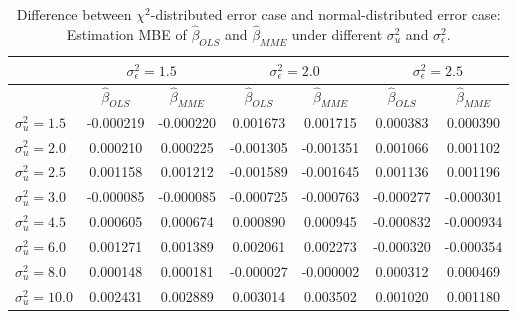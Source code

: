 \documentclass{article}
\begin{document}
\begin{table}[ht]
    \centering
    \caption{Difference between $\chi^2$-distributed error case and normal-distributed error case: Estimation MBE of $\hat{\beta}_{OLS}$ and $\hat{\beta}_{MME}$ under different $\sigma^2_u$ and $\sigma^2_\epsilon$.}
    \label{Tab:MBE_diff_chi_normal}
    \begin{tabular}[t]{lcccccc}
        \hline
        &\multicolumn{2}{c}{$\sigma^2_\epsilon=1.5$}&\multicolumn{2}{c}{$\sigma^2_\epsilon=2.0$}&\multicolumn{2}{c}{$\sigma^2_\epsilon=2.5$}\\
        \hline
        &$\hat{\beta}_{OLS}$&$\hat{\beta}_{MME}$&$\hat{\beta}_{OLS}$&$\hat{\beta}_{MME}$&$\hat{\beta}_{OLS}$&$\hat{\beta}_{MME}$\\
        \hline
        $\sigma^2_u = 1.5$&-0.000219&-0.000220&0.001673&0.001715&0.000383&0.000390\\
        $\sigma^2_u = 2.0$&0.000210&0.000225&-0.001305&-0.001351&0.001066&0.001102\\
        $\sigma^2_u = 2.5$&0.001158&0.001212&-0.001589&-0.001645&0.001136&0.001196\\
        $\sigma^2_u = 3.0$&-0.000085&-0.000085&-0.000725&-0.000763&-0.000277&-0.000301\\
        $\sigma^2_u = 4.5$&0.000605&0.000674&0.000890&0.000945&-0.000832&-0.000934\\
        $\sigma^2_u = 6.0$&0.001271&0.001389&0.002061&0.002273&-0.000320&-0.000354\\
        $\sigma^2_u = 8.0$&0.000148&0.000181&-0.000027&-0.000002&0.000312&0.000469\\
        $\sigma^2_u = 10.0$&0.002431&0.002889&0.003014&0.003502&0.001020&0.001180\\
        \hline
    \end{tabular}
\end{table}
\end{document}
